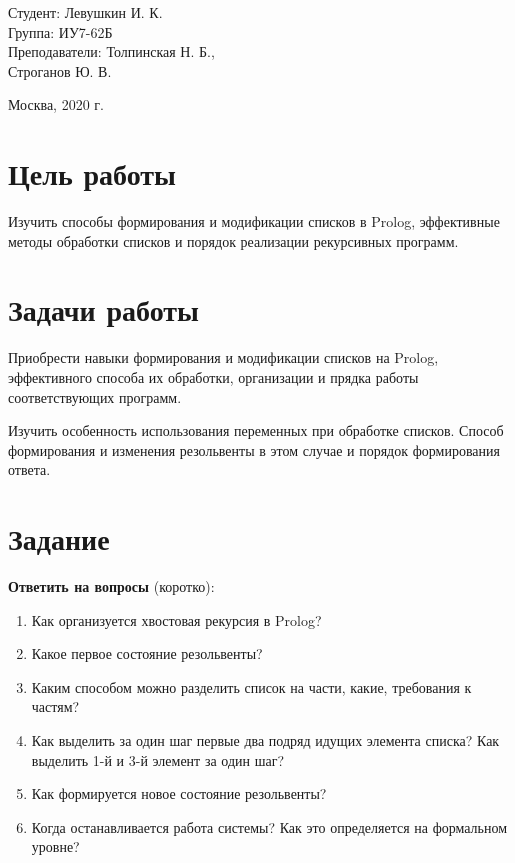 \documentclass[a4paper,12pt]{article}
\begin{document}
\vspace*{15mm} 	

\large
\begin{flushright}
	Студент: Левушкин И. К. \\
	Группа: ИУ7-62Б \\
	Преподаватели: Толпинская Н. Б., \\ Строганов Ю. В. \\
\end{flushright}

\vspace*{30mm}
\begin{center}
	Москва, 2020 г.  
\end{center}
\thispagestyle{empty}


\newpage

\section*{Цель работы}

Изучить способы формирования и модификации списков в Prolog, эффективные методы обработки списков и порядок реализации рекурсивных программ.

\section*{Задачи работы}

Приобрести навыки формирования и модификации списков на Prolog, эффективного способа их обработки, организации и прядка работы соответствующих программ.

Изучить особенность использования переменных при обработке списков. Способ формирования и изменения резольвенты в этом случае и порядок формирования ответа. 


\section*{Задание}

{\bf Ответить на вопросы} (коротко):
\begin{enumerate}
	\item Как организуется хвостовая рекурсия в Prolog? 
	\item Какое первое состояние резольвенты?
	\item Каким способом можно разделить список на части, какие, требования к частям?
	\item Как выделить за один шаг первые два подряд идущих элемента списка? Как выделить 1-й и 3-й элемент за один шаг?
	\item Как формируется новое состояние резольвенты?
	\item Когда останавливается работа системы? Как это определяется на формальном уровне?
\end{enumerate}
	
\end{document}
